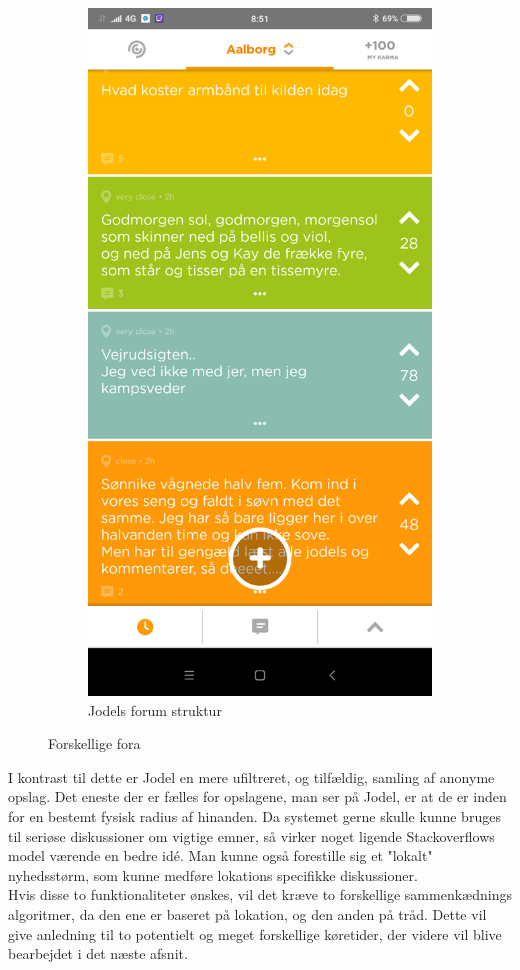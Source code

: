 \begin{figure}[H]
\begin{subfigure}{0.5\textwidth}
        \includegraphics[width=0.7\linewidth]{Projectdoc/Assets/Illustrationer/jodel_forum_eksempel.png}
        \caption{Jodels forum struktur}
        \label{fig:jodel_forum}
    \end{subfigure}
    \caption{Forskellige fora}
    \label{fig:forskellige_fora}
\end{figure}

I kontrast til dette er Jodel en mere ufiltreret, og tilfældig, samling af anonyme opslag. Det eneste der er fælles for opslagene, man ser på Jodel, er at de er inden for en bestemt fysisk radius af hinanden.
Da systemet gerne skulle kunne bruges til seriøse diskussioner om vigtige emner, så virker noget ligende Stackoverflows model værende en bedre idé. Man kunne også forestille sig et "lokalt" nyhedsstørm, som kunne medføre lokations specifikke diskussioner.\\
Hvis disse to funktionaliteter ønskes, vil det kræve to forskellige sammenkædnings algoritmer, da den ene er baseret på lokation, og den anden på tråd. Dette vil give anledning til to potentielt og meget forskellige køretider, der videre vil blive bearbejdet i det næste afsnit.

